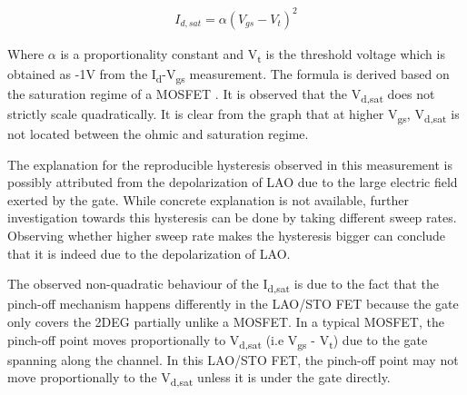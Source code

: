 \documentclass[11pt,a4paper]{report}
\begin{document}
\begin{align}
    I_{d,sat} = \alpha(V_{gs} - V_t)^2 \label{eq:saturation_eq}
\end{align}

Where $\alpha$ is a proportionality constant and V\textsubscript{t} is the threshold voltage which is obtained as -1V from the I\textsubscript{d}-V\textsubscript{gs} measurement. The formula is derived based on the saturation regime of a MOSFET \cite{Semiconductor_explained_more}. It is observed that the V\textsubscript{d,sat} does not strictly scale quadratically. It is clear from the graph that at higher V\textsubscript{gs}, V\textsubscript{d,sat} is not located between the ohmic and saturation regime. 


The explanation for the reproducible hysteresis observed in this measurement is possibly attributed from the depolarization of LAO due to the large electric field exerted by the gate. While concrete explanation is not available, further investigation towards this hysteresis can be done by taking different sweep rates. Observing whether higher sweep rate makes the hysteresis bigger can conclude that it is indeed due to the depolarization of LAO.

The observed non-quadratic behaviour of the I\textsubscript{d,sat} is due to the fact that the pinch-off mechanism happens differently in the LAO/STO FET because the gate only covers the 2DEG partially unlike a MOSFET. In a typical MOSFET, the pinch-off point moves proportionally to V\textsubscript{d,sat} (i.e V\textsubscript{gs} - V\textsubscript{t}) due to the gate spanning along the channel. In this LAO/STO FET, the pinch-off point may not move proportionally to the V\textsubscript{d,sat} unless it is under the gate directly.



 
\end{document}
